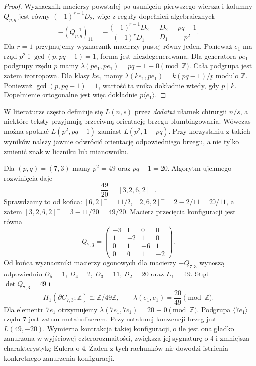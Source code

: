 \begin{proof}
Wyznacznik macierzy powstałej po usunięciu pierwszego
wiersza i kolumny $Q_{p,q}$ jest równy
$(-1)^{r-1}D_2$, więc z reguły dopełnień algebraicznych
\[
-(Q_{p,q}^{-1})_{11}=
-\frac{(-1)^{r-1}D_2}{(-1)^rD_1}
=\frac{D_2}{D_1}=
\frac{pq-1}{p^2}.
\]
Dla $r=1$ przyjmujemy wyznacznik macierzy pustej równy jeden.
Ponieważ $e_1$ ma rząd $p^2$ i $\gcd(p,pq-1)=1$,
forma jest niezdegenerowana. Dla generatora $pe_1$ podgrupy
rzędu $p$ mamy
$\lambda(pe_1,pe_1)=pq-1\equiv0\pmod{\mathbb Z}$.
Cała podgrupa jest zatem izotropowa.
Dla klasy $ke_1$ mamy
$\lambda(ke_1,pe_1)=k(pq-1)/p$ modulo $\mathbb Z$.
Ponieważ $\gcd(p,pq-1)=1$, wartość ta znika
dokładnie wtedy, gdy $p\mid k$. Dopełnienie
ortogonalne jest więc dokładnie $p\langle e_1\rangle$.
\end{proof}

\begin{uwaga}
W literaturze często definiuje się $L(n,s)$ przez
\emph{dodatni} ułamek chirurgii $n/s$, a niektóre teksty
przyjmują przeciwną orientację brzegu plumbingowania.
Wówczas można spotkać $L(p^2,pq-1)$ zamiast
$L(p^2,1-pq)$. Przy korzystaniu z takich wyników
należy jawnie odwrócić orientację odpowiedniego brzegu,
a nie tylko zmienić znak w liczniku lub mianowniku.
\end{uwaga}

\begin{przyklad}
\label{ex:tg-general-C73}
Dla $(p,q)=(7,3)$ mamy $p^2=49$ oraz
$pq-1=20$. Algorytm ujemnego rozwinięcia daje
\[
\frac{49}{20}=[3,2,6,2]^-.
\]
Sprawdzamy to od końca:
$[6,2]^-=11/2$,
$[2,6,2]^-=2-2/11=20/11$,
a zatem $[3,2,6,2]^-=3-11/20=49/20$.
Macierz przecięcia konfiguracji jest równa
\[
Q_{7,3}=
\begin{pmatrix}
-3&1&0&0\\
1&-2&1&0\\
0&1&-6&1\\
0&0&1&-2
\end{pmatrix}.
\]
Od końca wyznaczniki macierzy ogonowych
dla macierzy $-Q_{7,3}$
wynoszą odpowiednio
$D_5=1$, $D_4=2$, $D_3=11$,
$D_2=20$ oraz $D_1=49$.
Stąd $\det Q_{7,3}=49$ i
\[
H_1(\partial C_{7,3};\mathbb Z)
\cong\mathbb Z/49\mathbb Z,\qquad
\lambda(e_1,e_1)=\frac{20}{49}\pmod{\mathbb Z}.
\]
Dla elementu $7e_1$ otrzymujemy
$\lambda(7e_1,7e_1)=20\equiv0\pmod{\mathbb Z}$.
Podgrupa $\langle7e_1\rangle$ rzędu $7$
jest zatem metabolizerem.
Przy ustalonej konwencji brzeg jest
$L(49,-20)$. Wymierna kontrakcja
takiej konfiguracji, o ile jest ona
gładko zanurzona w wyjściowej
czterorozmaitości, zwiększa jej sygnaturę
o $4$ i zmniejsza charakterystykę Eulera o $4$.
Żaden z tych rachunków nie dowodzi
istnienia konkretnego zanurzenia konfiguracji.
\end{przyklad}


